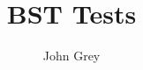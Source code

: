 \documentclass[12pt]{article}
\title{BST Tests}
\author{John Grey}
\begin{document}
\maketitle
\nocite{*}

% 

\end{document}
